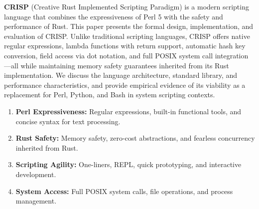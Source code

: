 \documentclass[11pt,a4paper]{article}
\begin{document}
\clearpage

{}
\tableofcontents
\clearpage

\begin{tcolorbox}[colback=lightlavender, colframe=softvioletdark, title=\textbf{\textcolor{darkpurple}{Abstract}}, fonttitle=\bfseries\large, sharp corners]
\textbf{CRISP} (Creative Rust Implemented Scripting Paradigm) is a modern scripting language that combines the expressiveness of Perl 5 with the safety and performance of Rust. This paper presents the formal design, implementation, and evaluation of CRISP. Unlike traditional scripting languages, CRISP offers native regular expressions, lambda functions with return support, automatic hash key conversion, field access via dot notation, and full POSIX system call integration—all while maintaining memory safety guarantees inherited from its Rust implementation. We discuss the language architecture, standard library, and performance characteristics, and provide empirical evidence of its viability as a replacement for Perl, Python, and Bash in system scripting contexts.
\end{tcolorbox}

\vspace{1em}

\begin{tcolorbox}[colback=softviolet!30, colframe=softvioletdark, title=\textbf{\textcolor{darkpurple}{Core Principles}}, fonttitle=\bfseries, sharp corners]
\begin{enumerate}[label=\textcolor{mediumpurple}{\textbf{(\arabic*)}}, leftmargin=*]
    \item \textbf{\textcolor{darkpurple}{Perl Expressiveness:}} Regular expressions, built-in functional tools, and concise syntax for text processing.
    \item \textbf{\textcolor{rustorange}{Rust Safety:}} Memory safety, zero-cost abstractions, and fearless concurrency inherited from Rust.
    \item \textbf{\textcolor{codecyan}{Scripting Agility:}} One-liners, REPL, quick prototyping, and interactive development.
    \item \textbf{\textcolor{codegreen}{System Access:}} Full POSIX system calls, file operations, and process management.
\end{enumerate}
\end{tcolorbox}

\end{document}
